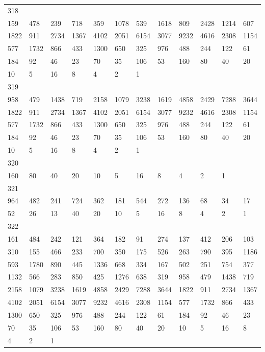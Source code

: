 \begin{longtable}{llllllllllll}
318&&&&&&&&&&&\\
159& 478& 239& 718& 359& 1078& 539& 1618& 809& 2428& 1214& 607\\
1822& 911& 2734& 1367& 4102& 2051& 6154& 3077& 9232& 4616& 2308& 1154\\
577& 1732& 866& 433& 1300& 650& 325& 976& 488& 244& 122& 61\\
184& 92& 46& 23& 70& 35& 106& 53& 160& 80& 40& 20\\
10& 5& 16& 8& 4& 2& 1& \\

319&&&&&&&&&&&\\
958& 479& 1438& 719& 2158& 1079& 3238& 1619& 4858& 2429& 7288& 3644\\
1822& 911& 2734& 1367& 4102& 2051& 6154& 3077& 9232& 4616& 2308& 1154\\
577& 1732& 866& 433& 1300& 650& 325& 976& 488& 244& 122& 61\\
184& 92& 46& 23& 70& 35& 106& 53& 160& 80& 40& 20\\
10& 5& 16& 8& 4& 2& 1& \\

320&&&&&&&&&&&\\
160& 80& 40& 20& 10& 5& 16& 8& 4& 2& 1& \\

321&&&&&&&&&&&\\
964& 482& 241& 724& 362& 181& 544& 272& 136& 68& 34& 17\\
52& 26& 13& 40& 20& 10& 5& 16& 8& 4& 2& 1\\

322&&&&&&&&&&&\\
161& 484& 242& 121& 364& 182& 91& 274& 137& 412& 206& 103\\
310& 155& 466& 233& 700& 350& 175& 526& 263& 790& 395& 1186\\
593& 1780& 890& 445& 1336& 668& 334& 167& 502& 251& 754& 377\\
1132& 566& 283& 850& 425& 1276& 638& 319& 958& 479& 1438& 719\\
2158& 1079& 3238& 1619& 4858& 2429& 7288& 3644& 1822& 911& 2734& 1367\\
4102& 2051& 6154& 3077& 9232& 4616& 2308& 1154& 577& 1732& 866& 433\\
1300& 650& 325& 976& 488& 244& 122& 61& 184& 92& 46& 23\\
70& 35& 106& 53& 160& 80& 40& 20& 10& 5& 16& 8\\
4& 2& 1& \\


\end{longtable}
